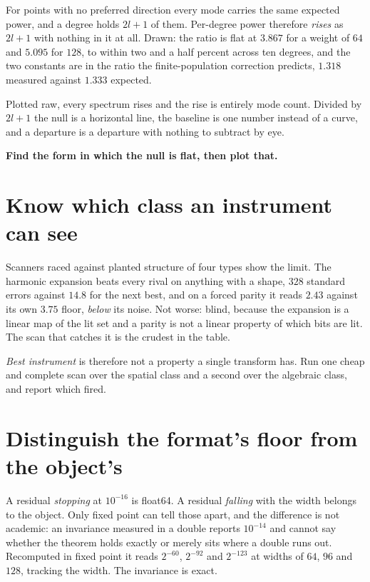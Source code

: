 For points with no preferred direction every mode carries the same expected power, and a degree holds \(2l+1\) of them. Per-degree power therefore \emph{rises} as \(2l+1\) with nothing in it at all. Drawn: the ratio is flat at \(3.867\) for a weight of \(64\) and \(5.095\) for \(128\), to within two and a half percent across ten degrees, and the two constants are in the ratio the finite-population correction predicts, \(1.318\) measured against \(1.333\) expected.

Plotted raw, every spectrum rises and the rise is entirely mode count. Divided by \(2l+1\) the null is a horizontal line, the baseline is one number instead of a curve, and a departure is a departure with nothing to subtract by eye.

\textbf{Find the form in which the null is flat, then plot that.}

\section{Know which class an instrument can see}

Scanners raced against planted structure of four types show the limit. The harmonic expansion beats every rival on anything with a shape, \(328\) standard errors against \(14.8\) for the next best, and on a forced parity it reads \(2.43\) against its own \(3.75\) floor, \emph{below} its noise. Not worse: blind, because the expansion is a linear map of the lit set and a parity is not a linear property of which bits are lit. The scan that catches it is the crudest in the table.

\emph{Best instrument} is therefore not a property a single transform has. Run one cheap and complete scan over the spatial class and a second over the algebraic class, and report which fired.

\section{Distinguish the format's floor from the object's}

A residual \emph{stopping} at \(10^{-16}\) is float64. A residual \emph{falling} with the width belongs to the object. Only fixed point can tell those apart, and the difference is not academic: an invariance measured in a double reports \(10^{-14}\) and cannot say whether the theorem holds exactly or merely sits where a double runs out. Recomputed in fixed point it reads \(2^{-60}\), \(2^{-92}\) and \(2^{-123}\) at widths of \(64\), \(96\) and \(128\), tracking the width. The invariance is exact.

